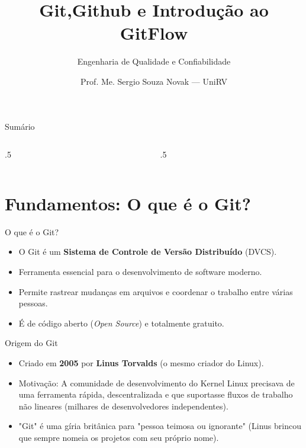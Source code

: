 \documentclass[aspectratio=169]{beamer}
\title[Git,Github e Introdução ao GitFlow]{Git,Github e Introdução ao GitFlow}
\subtitle{Engenharia de Qualidade e Confiabilidade}
\author{Prof. Me. Sergio Souza Novak — UniRV}
\begin{document}
\frame[plain]{\titlepage}

\begin{frame}{Sumário}
    \begin{columns}[t]
        \begin{column}{.5\textwidth}
            \tableofcontents[sections={1-4}]
        \end{column}
        \begin{column}{.5\textwidth}
            \tableofcontents[sections={5-7}]
        \end{column}
    \end{columns}
\end{frame}

\section{Fundamentos: O que é o Git?}

\begin{frame}{O que é o Git?}
    \begin{itemize}
        \item O Git é um \textbf{Sistema de Controle de Versão Distribuído} (DVCS).
        \item Ferramenta essencial para o desenvolvimento de software moderno.
        \item Permite rastrear mudanças em arquivos e coordenar o trabalho entre várias pessoas.
        \item É de código aberto (\textit{Open Source}) e totalmente gratuito.
    \end{itemize}
\end{frame}

\begin{frame}{Origem do Git}
    \begin{itemize}
        \item Criado em \textbf{2005} por \textbf{Linus Torvalds} (o mesmo criador do Linux).
        \item Motivação: A comunidade de desenvolvimento do Kernel Linux precisava de uma ferramenta rápida, descentralizada e que suportasse fluxos de trabalho não lineares (milhares de desenvolvedores independentes).
        \item "Git" é uma gíria britânica para "pessoa teimosa ou ignorante" (Linus brincou que sempre nomeia os projetos com seu próprio nome).
    \end{itemize}
\end{frame}
\end{document}
